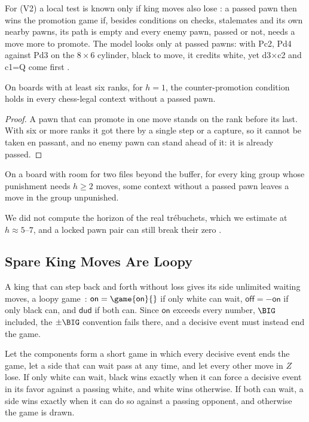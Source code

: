 For (V2) a local test is known only if king moves also lose : a passed pawn then wins the promotion
game if, besides conditions on checks, stalemates and its own nearby pawns, its path is empty and every enemy
pawn, passed or not, needs a move more to promote. The model looks only at passed pawns: with Pc2, Pd4 against
Pd3 on the $8\times6$ cylinder, black to move, it credits white, yet d3$\times$c2 and c1=Q come first .

\begin{proposition}[\lab{S}]\label{prop:horizon1}
On boards with at least six ranks, for $h=1$, the counter-promotion condition holds in every chess-legal
context without a passed pawn.
\end{proposition}

\begin{proof}
A pawn that can promote in one move stands on the rank before its last. With six or more ranks it got there by a
single step or a capture, so it cannot be taken en passant, and no enemy pawn can stand ahead of it: it is
already passed.
\end{proof}

\begin{conjecture}\label{conj:horizon2}
On a board with room for two files beyond the buffer, for every king group whose punishment needs $h\ge2$
moves, some context without a passed pawn leaves a move in the group unpunished.
\end{conjecture}

We did not compute the horizon of the real tr\'ebuchets, which we estimate at $h\approx5$--$7$, and a locked pawn pair can still break their zero .

\subsection{Spare King Moves Are Loopy}

A king that can step back and forth without loss gives its side unlimited waiting moves, a loopy
game~\cite{WinningWays,Siegel2013}: $\textsf{on}=\game{\textsf{on}}{}$ if only white can wait,
$\textsf{off}=-\textsf{on}$ if only black can, and $\textsf{dud}$ if both can. Since $\textsf{on}$ exceeds every number, $\BIG$ included, the $\pm\BIG$ convention fails there, and a
decisive event must instead end the game.

\begin{theorem}\label{thm:loopy}
Let the components form a short game in which every decisive event ends the game, let a side that can wait pass
at any time, and let every other move in $Z$ lose. If only white can wait, black wins exactly when it can force a decisive
event in its favor against a passing white, and white wins otherwise. If both can wait, a side wins exactly when
it can do so against a passing opponent, and otherwise the game is drawn.
\end{theorem}

